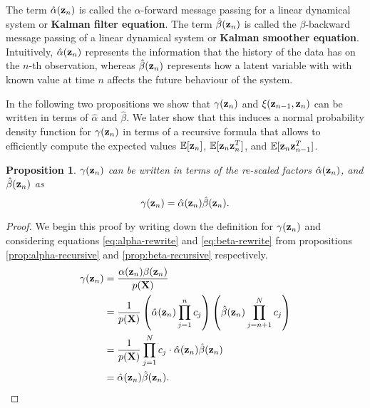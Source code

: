 \documentclass[11pt]{article}
\numberwithin{equation}{section}
\newcommand{\x}{{\bf x}}
\newcommand{\z}{{\bf z}}
\newtheorem{proposition}{Proposition}[section]
\begin{document}
%

The term $\hat\alpha(\z_n)$ is called the $\alpha$-forward message passing for a linear dynamical system or \textbf{Kalman filter equation}.  The term $\hat\beta(\z_n)$ is called the $\beta$-backward message passing of a linear dynamical system or \textbf{Kalman smoother equation}. Intuitively, $\hat\alpha(\z_n)$ represents the information that the history of the data has on the $n$-th observation, whereas $\hat\beta(\z_n)$ represents how a latent variable with with known value at time $n$ affects the future behaviour of the system.

In the following two propositions we show that $\gamma(\z_n)$ and $\xi(\z_{n-1}, \z_{n})$ can be written in terms of $\hat\alpha$ and $\hat\beta$. We later show that this induces a normal probability density function for $\gamma(\z_n)$ in terms of a recursive formula that allows to efficiently compute the expected values $\mathbb{E}[\z_n]$, $\mathbb{E}[\z_n\z_{n}^{T}]$, and  $\mathbb{E}[\z_n\z_{n-1}^{T}]$.


\begin{proposition}\label{prop:gamma-rewrite-scaled}
	$\gamma(\z_n)$ can be written in terms of the re-scaled factors $\hat\alpha(\z_n)$, and $\hat\beta(\z_n)$ as
	\begin{equation}
		\gamma(\z_n) = \hat\alpha(\z_n)\hat\beta(\z_n).
	\end{equation}
\end{proposition}

\begin{proof} We begin this proof by writing down the definition for $\gamma(\z_n)$ and considering equations \eqref{eq:alpha-rewrite} and \eqref{eq:beta-rewrite} from propositions \ref{prop:alpha-recursive} and \ref{prop:beta-recursive} respectively.
	\begin{align}
		\gamma(\z_n) &= \frac{\alpha(\z_n) \beta(\z_n)}{p({\bf X})} \\
		&= \frac{1}{p({\bf X})}\left(\hat\alpha(\z_n) \prod_{j=1}^n c_j\right)\left(\hat\beta(\z_n) \prod_{j={n+1}}^N c_j\right) \\
		&= \frac{1}{p(\bf X)} \prod_{j=1}^N c_j \cdot \hat\alpha(\z_n) \hat\beta(\z_n)\\
		&= \hat\alpha(\z_n) \hat\beta(\z_n).
	\end{align}
\end{proof}
\end{document}
